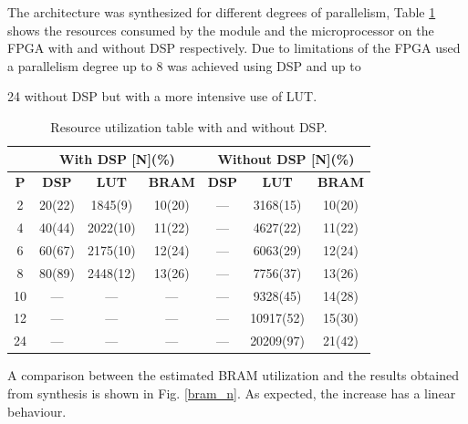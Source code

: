 \documentclass[conference,compsoc]{IEEEtran}
\begin{document}
The architecture was synthesized for different degrees of parallelism, Table
\ref{res_table} shows the resources consumed by the module and the
microprocessor on the FPGA with and without DSP respectively. Due to limitations
of the FPGA used a parallelism degree up to 8 was achieved using DSP and up to

24 without DSP but with a more intensive use of LUT.

\begin{table}[!t]
\renewcommand{\arraystretch}{1.3}
\caption{Resource utilization table with and without DSP.}
\label{res_table}
\centering
\begin{tabular}{|c|c|c|c|c|c|c|}
  \hline
  & \multicolumn{3}{c|}{\textbf{With DSP [N](\%)}} & \multicolumn{3}{c|}{\textbf{Without DSP [N](\%)}} \\ \hline
  \textbf{P}  & \textbf{DSP}            & \textbf{LUT}        & \textbf{BRAM}       & \textbf{DSP}         & \textbf{LUT}           & \textbf{BRAM}         \\ \hline
  2  & 20(22)         & 1845(9)    & 10(20)     & ---         & 3168(15)      & 10(20)         \\ \hline
  4  & 40(44)         & 2022(10)   & 11(22)     & ---         & 4627(22)      & 11(22)         \\ \hline
  6  & 60(67)         & 2175(10)   & 12(24)     & ---         & 6063(29)      & 12(24)         \\ \hline
  8  & 80(89)         & 2448(12)   & 13(26)     & ---         & 7756(37)      & 13(26)         \\ \hline
  10 & ---            & ---        & ---        & ---         & 9328(45)      & 14(28)         \\ \hline
  12 & ---            & ---        & ---        & ---         & 10917(52)     & 15(30)         \\ \hline
  24 & ---            & ---        & ---        & ---         & 20209(97)     & 21(42)         \\ \hline
\end{tabular}           
\end{table}
  
A comparison between the estimated BRAM utilization and the results obtained
from synthesis is shown in Fig. \ref{bram_n}. As expected, the increase has a
linear behaviour. 
\end{document}
